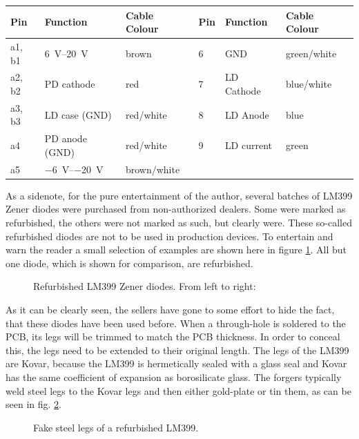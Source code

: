 \begin{table}[ht]
    \centering
    \begin{tabular}{llllll}
        \toprule
        Pin    & Function    & Cable Colour    & Pin    & Function    &  Cable Colour\\
        \midrule
        a1, b1    & \SIrange[print-implicit-plus=true]{6}{20}{\volt}    & brown    & \num{6}    & GND    & green/white\\
        a2, b2    & PD cathode    & red    & \num{7}    & LD Cathode    & blue/white\\
        a3, b3    & LD case (GND)    & red/white    & \num{8}    & LD Anode    & blue\\
        a4    & PD anode (GND)    & red/white    & \num{9}    & LD current    & green\\
        a5    & \SIrange{-6}{-20}{\volt}    & brown/white\\
        \bottomrule
    \end{tabular}
\end{table}

As a sidenote, for the pure entertainment of the author, several batches of LM399 Zener diodes were purchased from non-authorized dealers. Some were marked as refurbished, the others were not marked as such, but clearly were. These so-called refurbished diodes are not to be used in production devices. To entertain and warn the reader a small selection of examples are shown here in figure \ref{fig:fake_lm399}. All but one diode, which is shown for comparison, are refurbished.

\begin{figure}[h]
    \centering
    \caption{Refurbished LM399 Zener diodes. From left to right: }
    \label{fig:fake_lm399}
\end{figure}

As it can be clearly seen, the sellers have gone to some effort to hide the fact, that these diodes have been used before. When a through-hole is soldered to the PCB, its legs will be trimmed to match the PCB thickness. In order to conceal this, the legs need to be extended to their original length. The legs of the LM399 are Kovar, because the LM399 is hermetically sealed with a glass seal and Kovar has the same coefficient of expansion as borosilicate glass. The forgers typically weld steel legs to the Kovar legs and then either gold-plate or tin them, as can be seen in fig. \ref{fig:fake_lm399_legs}.

\begin{figure}[h]
    \centering
    \caption{Fake steel legs of a refurbished LM399.}
    \label{fig:fake_lm399_legs}
\end{figure}

